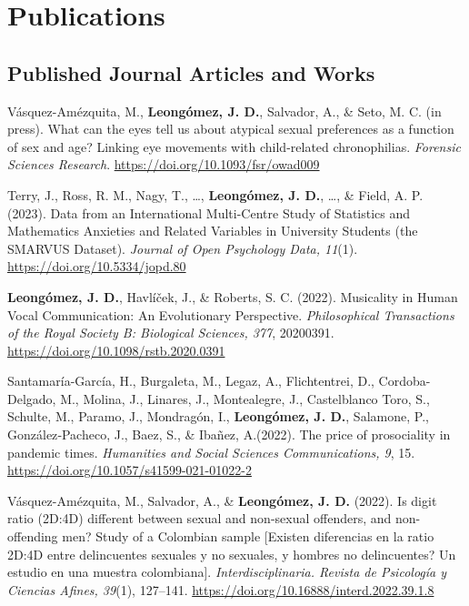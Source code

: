 \documentclass[11pt,a4paper,]{awesome-cv}
\begin{document}
\hypertarget{publications}{%
\section{Publications}\label{publications}}

\hypertarget{section}{%
\subsection{\texorpdfstring{\textbf{Published Journal Articles and Works}}{}}\label{section}}

\begingroup
\footnotesize
\setlength{\parindent}{-0.5in}
\setlength{\leftskip}{0.5in}

Vásquez-Amézquita, M., \textbf{Leongómez, J. D.}, Salvador, A., \& Seto,
M. C. (in press). What can the eyes tell us about atypical sexual
preferences as a function of sex and age? Linking eye movements with
child-related chronophilias. \emph{Forensic Sciences Research}.
\url{https://doi.org/10.1093/fsr/owad009}

Terry, J., Ross, R. M., Nagy, T., \ldots, \textbf{Leongómez, J. D.},
\ldots, \& Field, A. P. (2023). Data from an International Multi-Centre
Study of Statistics and Mathematics Anxieties and Related Variables in
University Students (the SMARVUS Dataset). \emph{Journal of Open
Psychology Data, 11}(1). \url{https://doi.org/10.5334/jopd.80}

\textbf{Leongómez, J. D.}, Havlíček, J., \& Roberts, S. C. (2022).
Musicality in Human Vocal Communication: An Evolutionary Perspective.
\emph{Philosophical Transactions of the Royal Society B: Biological
Sciences, 377}, 20200391. \url{https://doi.org/10.1098/rstb.2020.0391}

Santamaría-García, H., Burgaleta, M., Legaz, A., Flichtentrei, D.,
Cordoba-Delgado, M., Molina, J., Linares, J., Montealegre, J.,
Castelblanco Toro, S., Schulte, M., Paramo, J., Mondragón, I.,
\textbf{Leongómez, J. D.}, Salamone, P., González‑Pacheco, J., Baez, S.,
\& Ibañez, A.(2022). The price of prosociality in pandemic times.
\emph{Humanities and Social Sciences Communications, 9}, 15.
\url{https://doi.org/10.1057/s41599-021-01022-2}

Vásquez-Amézquita, M., Salvador, A., \& \textbf{Leongómez, J. D.}
(2022). Is digit ratio (2D:4D) different between sexual and non-sexual
offenders, and non-offending men? Study of a Colombian sample {[}Existen
diferencias en la ratio 2D:4D entre delincuentes sexuales y no sexuales,
y hombres no delincuentes? Un estudio en una muestra colombiana{]}.
\emph{Interdisciplinaria. Revista de Psicología y Ciencias Afines,
39}(1), 127--141. \url{https://doi.org/10.16888/interd.2022.39.1.8}
\end{document}
